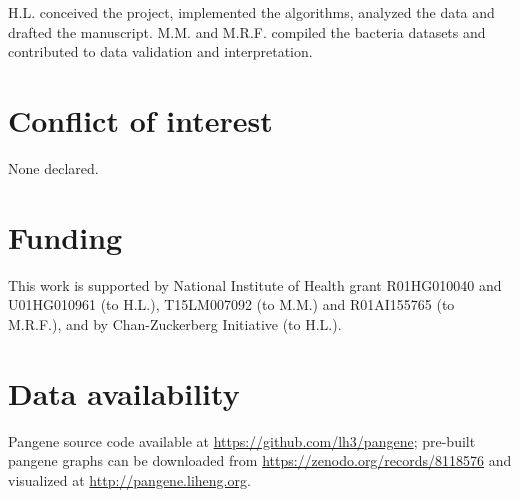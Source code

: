 \documentclass[webpdf,contemporary,large,namedate]{oup-authoring-template}%
\begin{document}
H.L. conceived the project, implemented the algorithms, analyzed the data and drafted the manuscript.
M.M. and M.R.F. compiled the bacteria datasets and contributed to data validation and interpretation.

\section*{Conflict of interest}

None declared.

\section*{Funding}

This work is supported by National Institute of Health grant R01HG010040 and U01HG010961 (to H.L.),
T15LM007092 (to M.M.) and R01AI155765 (to M.R.F.),
and by Chan-Zuckerberg Initiative (to H.L.).

\section*{Data availability}

Pangene source code available at \url{https://github.com/lh3/pangene};
pre-built pangene graphs can be downloaded from \url{https://zenodo.org/records/8118576}
and visualized at \url{http://pangene.liheng.org}.


{\sffamily\small
}
\end{document}
